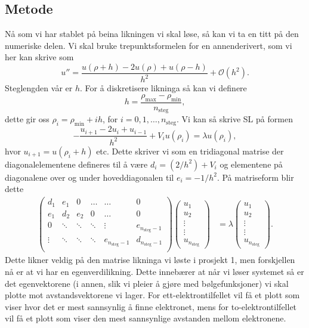 \documentclass[norsk, 11pt]{article}
\begin{document}
\subsection*{Metode}
Nå som vi har stablet på beina likningen vi skal løse, så kan vi ta en titt på den numeriske delen. Vi skal bruke trepunktsformelen for en annenderivert, som vi her kan skrive som
$$ u'' = \frac{u(\rho + h) - 2u(\rho) + u(\rho - h)}{h^2} + \mathcal{O}(h^2). $$
Steglengden vår er $h$. For å diskretisere likninga så kan vi definere
$$ h = \frac{\rho_{\text{max}} - \rho_{\text{min}}}{n_{\text{steg}}}, $$
dette gir oss $\rho_i = \rho_{\text{min}} + ih$, for $i=0,1,\ldots,n_\text{steg}$. Vi kan så skrive SL på formen
$$ -\frac{u_{i+1} - 2u_i + u_{i-1}}{h^2} + V_i u(\rho_i) = \lambda u(\rho_i), $$
hvor $u_{i+1} = u(\rho_i + h)$ etc. Dette skriver vi som en tridiagonal matrise der diagonalelementene defineres til å være $d_i = (2/h^2) + V_i$ og elementene på diagonalene over og under hoveddiagonalen til $e_i = -1/h^2$. På matriseform blir dette
\begin{align*}
	\left(\begin{matrix}
	d_1 & e_1 & 0 & \ldots & \ldots & 0 \\
	e_1 & d_2 & e_2 & 0 & \ldots & 0 \\
	0 & \ddots & \ddots & \ddots & \vdots & e_{n_{\text{steg}} - 1} \\
	\vdots & \ddots & \ddots & \ddots & e_{n_{\text{steg}} - 1} & d_{n_{\text{steg}} - 1} \\
	\end{matrix}\right)\left(
	\begin{matrix}
	u_1 \\ u_2 \\ \vdots \\ \vdots \\ u_{n_{\text{steg}}}
	\end{matrix}\right)
	&= \lambda\left(\begin{matrix}
	u_1 \\ u_2 \\ \vdots \\ \vdots \\ u_{n_{\text{steg}}}
	\end{matrix}\right).
\end{align*}
Dette likner veldig på den matrise likninga vi løste i prosjekt 1, men forskjellen nå er at vi har en egenverdilikning. Dette innebærer at når vi løser systemet så er det egenvektorene (i annen, slik vi pleier å gjøre med bølgefunksjoner) vi skal plotte mot avstandsvektorene vi lager. For ett-elektrontilfellet vil få et plott som viser hvor det er mest sannsynlig å finne elektronet, mens for to-elektrontilfellet vil få et plott som viser den mest sannsynlige avstanden mellom elektronene.
\end{document}
